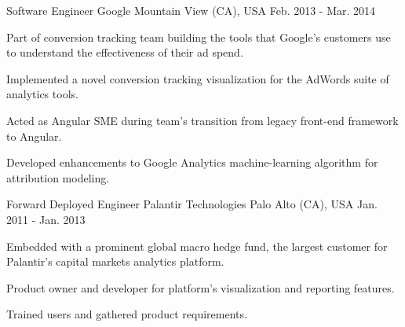 \begin{cventries}
  \cventry
    {Software Engineer} %
    {Google} %
    {Mountain View (CA), USA} %
    {Feb. 2013 - Mar. 2014} %
    {
      \begin{cvitems} %
        \item {Part of conversion tracking team building the tools that Google's customers use to understand the effectiveness of their ad spend.}
        \item {Implemented a novel conversion tracking visualization for the AdWords suite of analytics tools.}
        \item {Acted as Angular SME during team’s transition from legacy front-end framework to Angular.}
        \item {Developed enhancements to Google Analytics machine-learning algorithm for attribution modeling.}
      \end{cvitems}
    }

  \cventry
    {Forward Deployed Engineer} %
    {Palantir Technologies} %
    {Palo Alto (CA), USA} %
    {Jan. 2011 - Jan. 2013} %
    {
      \begin{cvitems} %
        \item {Embedded with a prominent global macro hedge fund, the largest customer for Palantir's capital markets analytics platform.}
        \item {Product owner and developer for platform's visualization and reporting features.}
        \item {Trained users and gathered product requirements.}
      \end{cvitems}
    }

\end{cventries}

